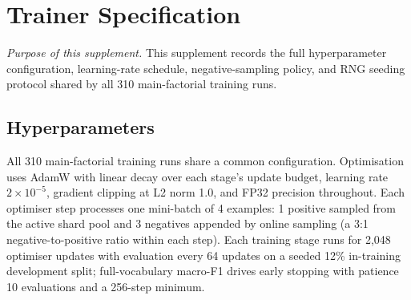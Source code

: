 \section{Trainer Specification}
\label{supp:trainer}

\textit{Purpose of this supplement.}\;
This supplement records the full hyperparameter configuration,
learning-rate schedule, negative-sampling policy, and RNG seeding
protocol shared by all 310 main-factorial training runs.

\subsection{Hyperparameters}

All 310 main-factorial training runs share a common configuration.
Optimisation uses AdamW with linear decay over each stage's update
budget, learning rate $2\times 10^{-5}$, gradient clipping at L2
norm 1.0, and FP32 precision throughout. Each optimiser step
processes one mini-batch of 4 examples: 1 positive sampled from the
active shard pool and 3 negatives appended by online sampling (a 3:1
negative-to-positive ratio within each step). Each training stage
runs for 2{,}048 optimiser updates with evaluation every 64 updates
on a seeded 12\% in-training development split; full-vocabulary
macro-F1 drives early stopping with patience 10 evaluations and a
256-step minimum.


